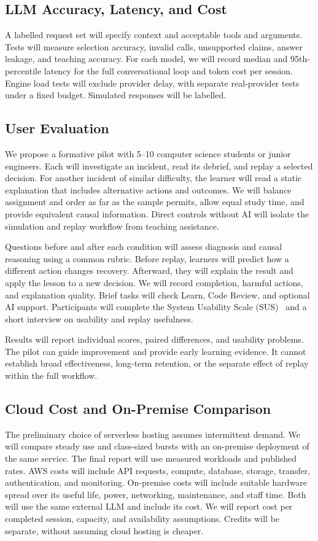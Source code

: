\documentclass[11pt,a4paper]{article}
\begin{document}
\subsection{LLM Accuracy, Latency, and Cost}
A labelled request set will specify context and acceptable tools and arguments.
Tests will measure selection accuracy, invalid calls, unsupported claims,
answer leakage, and teaching accuracy. For each model, we will record median
and 95th-percentile latency for the full conversational loop and token cost
per session. Engine load tests will exclude provider delay, with separate
real-provider tests under a fixed budget. Simulated responses will be labelled.

\newpage
\subsection{User Evaluation}
We propose a formative pilot with 5--10 computer science students or junior
engineers. Each will investigate an incident, read its debrief, and replay a
selected decision. For another incident of similar difficulty, the learner
will read a static explanation that includes alternative actions and outcomes.
We will balance assignment and order as far as the sample permits, allow equal
study time, and provide equivalent causal information. Direct controls without
AI will isolate the simulation and replay workflow from teaching assistance.

Questions before and after each condition will assess diagnosis and causal
reasoning using a common rubric. Before replay, learners will predict how a
different action changes recovery. Afterward, they will explain the result and
apply the lesson to a new decision. We will record completion, harmful actions,
and explanation quality. Brief tasks will check Learn, Code Review, and optional
AI support. Participants will complete the System Usability Scale
(SUS)~\cite{sus} and a short interview on usability and replay usefulness.

Results will report individual scores, paired differences, and usability
problems. The pilot can guide improvement and provide early learning evidence.
It cannot establish broad effectiveness, long-term retention, or the separate
effect of replay within the full workflow.

\subsection{Cloud Cost and On-Premise Comparison}
The preliminary choice of serverless hosting assumes intermittent demand.
We will compare steady use and class-sized bursts with an on-premise deployment
of the same service. The final report will use measured workloads and published
rates. AWS costs will include API requests, compute, database, storage, transfer,
authentication, and monitoring. On-premise costs will
include suitable hardware spread over its useful life, power, networking,
maintenance, and staff time. Both will use the same external LLM and include
its cost. We will report cost per completed session, capacity, and availability
assumptions. Credits will be separate, without assuming cloud hosting is cheaper.
\end{document}
